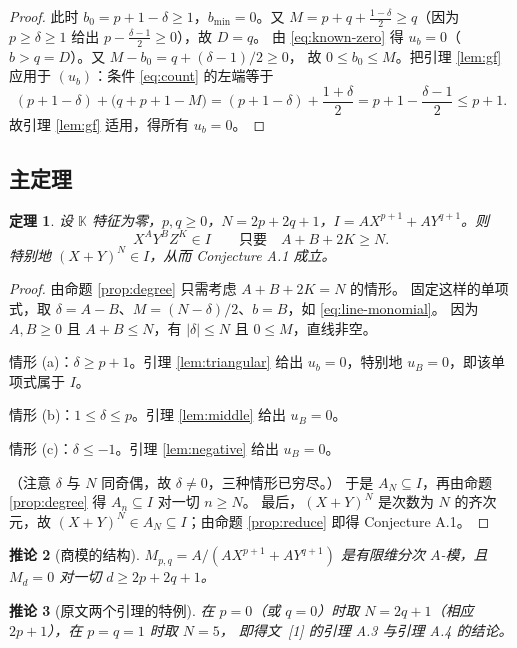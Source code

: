 \documentclass[11pt,UTF8]{ctexart}
\newtheorem{theorem}{定理}[section]
\newtheorem{corollary}[theorem]{推论}
\theoremstyle{definition}
\newcommand{\K}{\mathbb{K}}
\begin{document}
\begin{proof}
此时 $b_0=p+1-\delta\ge1$，$b_{\min}=0$。又
$M=p+q+\frac{1-\delta}{2}\ge q$（因为 $p\ge\delta\ge1$ 给出 $p-\frac{\delta-1}{2}\ge0$），故 $D=q$。
由 \eqref{eq:known-zero} 得 $u_b=0$（$b>q=D$）。又 $M-b_0=q+(\delta-1)/2\ge0$，
故 $0\le b_0\le M$。把引理 \ref{lem:gf} 应用于 $(u_b)$：条件
\eqref{eq:count} 的左端等于
\[
(p+1-\delta)+\bigl(q+p+1-M\bigr)=(p+1-\delta)+\frac{1+\delta}{2}
=p+1-\frac{\delta-1}{2}\le p+1 .
\]
故引理 \ref{lem:gf} 适用，得所有 $u_b=0$。
\end{proof}

\subsection{主定理}

\begin{theorem}\label{thm:main}
设 $\K$ 特征为零，$p,q\ge0$，$N=2p+2q+1$，$I=AX^{p+1}+AY^{q+1}$。则
\[
X^{A}Y^{B}Z^{K}\in I\qquad\text{只要}\quad A+B+2K\ge N .
\]
特别地 $(X+Y)^{N}\in I$，从而 Conjecture A.1 成立。
\end{theorem}

\begin{proof}
由命题 \ref{prop:degree} 只需考虑 $A+B+2K=N$ 的情形。
固定这样的单项式，取 $\delta=A-B$、$M=(N-\delta)/2$、$b=B$，如 \eqref{eq:line-monomial}。
因为 $A,B\ge0$ 且 $A+B\le N$，有 $|\delta|\le N$ 且 $0\le M$，直线非空。

情形 (a)：$\delta\ge p+1$。引理 \ref{lem:triangular} 给出 $u_b=0$，特别地 $u_B=0$，即该单项式属于 $I$。

情形 (b)：$1\le\delta\le p$。引理 \ref{lem:middle} 给出 $u_B=0$。

情形 (c)：$\delta\le-1$。引理 \ref{lem:negative} 给出 $u_B=0$。

（注意 $\delta$ 与 $N$ 同奇偶，故 $\delta\ne0$，三种情形已穷尽。）
于是 $A_N\subseteq I$，再由命题 \ref{prop:degree} 得 $A_n\subseteq I$ 对一切 $n\ge N$。
最后，$(X+Y)^N$ 是次数为 $N$ 的齐次元，故 $(X+Y)^N\in A_N\subseteq I$；由命题 \ref{prop:reduce}
即得 Conjecture A.1。
\end{proof}

\begin{corollary}[商模的结构]\label{cor:finite}
$M_{p,q}=A/(AX^{p+1}+AY^{q+1})$ 是有限维分次 $A$-模，且 $M_d=0$ 对一切 $d\ge2p+2q+1$。
\end{corollary}

\begin{corollary}[原文两个引理的特例]\label{cor:paper}
在 $p=0$（或 $q=0$）时取 $N=2q+1$（相应 $2p+1$），在 $p=q=1$ 时取 $N=5$，
即得文~[1] 的引理 A.3 与引理 A.4 的结论。
\end{corollary}
\end{document}
